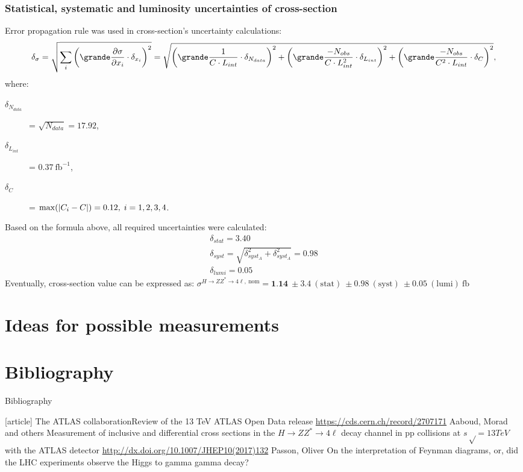 \documentclass[aspectratio=1610, english]{beamer}
\newcommand{\hzz}{ H\rightarrow ZZ^{*}\rightarrow 4 \ell}
\begin{document}
\begin{frame}
\frametitle{Statistical, systematic and luminosity uncertainties of cross-section}
Error propagation rule was used in cross-section's uncertainty calculations:
\begin{equation}
\delta_{\sigma}=\sqrt{\sum_i\qty(\grande \pdv{\sigma}{x_i}\cdot \delta_{x_i} )^2} = \sqrt{\qty(\grande \frac{1}{C\cdot L_{int}}\cdot \delta_{N_{data}})^2 + \qty(\grande \frac{-N_{obs}}{C\cdot L_{int}^2}\cdot \delta_{L_{int}})^2 + \qty(\grande \frac{-N_{obs}}{C^2\cdot L_{int}}\cdot \delta_{C})^2 } ,
\end{equation}
where:
\begin{description}
\item[$\delta_{N_{data}}$] = $\sqrt{N_{data}}=17.92$,
\item[$\delta_{L_{int}}$] = $0.37 \: \mathrm{fb}^{-1}$,
\item[$\delta_C$] = $\max(\abs{C_i-C})=0.12, \; i=1, 2, 3, 4$.
\end{description}
\vspace{1cm}
Based on the formula above, all required uncertainties were calculated:
\begin{eqnarray}
    \delta_{stat}=3.40 \nonumber \\
    \delta_{syst}=\sqrt{\delta_{syst_A}^2 +\delta_{syst_A}^2}=0.98 \nonumber \\
    \delta_{lumi}=0.05 \nonumber
\end{eqnarray}
\vspace{1cm}
Eventually, cross-section value can be expressed as: $\sigma^{\hzz, \: \mathrm{nom}}=\textbf{1.14} \: \pm 3.4 \: \mathrm{(stat)} \: \pm 0.98 \: \mathrm{(syst)} \: \pm 0.05 \: \mathrm{(lumi) \: fb}$

\end{frame}

\section{Ideas for possible measurements}

\section{Bibliography}
\begin{frame}[allowframebreaks]{Bibliography}
\begin{thebibliography}{9}
		[article]
			{The ATLAS collaboration\newblock Review of the 13 TeV ATLAS Open Data release \newblock \url{https://cds.cern.ch/record/2707171}}
			{Aaboud, Morad and others \newblock Measurement of inclusive and differential cross sections in the $ \hzz $ decay channel in pp collisions at $s√ = 13 TeV$ with the ATLAS detector \newblock \url{http://dx.doi.org/10.1007/JHEP10(2017)132}}
			{Passon, Oliver \newblock On the interpretation of Feynman diagrams, or, did the LHC experiments observe the Higgs to gamma gamma decay?}
\end{thebibliography}
\end{frame}
\end{document}
